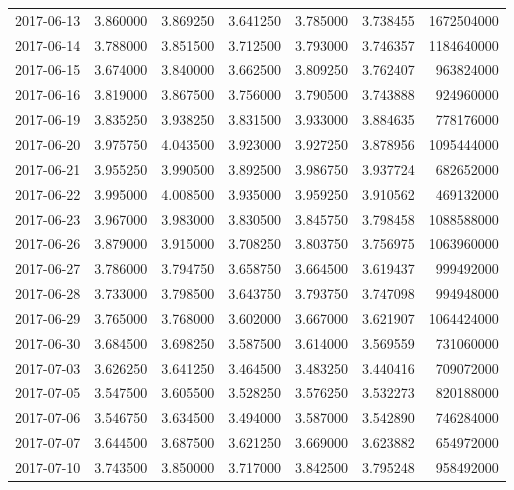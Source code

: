 \begin{tabular}{lrrrrrr}
2017-06-13 &    3.860000 &    3.869250 &    3.641250 &    3.785000 &    3.738455 &  1672504000 \\
2017-06-14 &    3.788000 &    3.851500 &    3.712500 &    3.793000 &    3.746357 &  1184640000 \\
2017-06-15 &    3.674000 &    3.840000 &    3.662500 &    3.809250 &    3.762407 &   963824000 \\
2017-06-16 &    3.819000 &    3.867500 &    3.756000 &    3.790500 &    3.743888 &   924960000 \\
2017-06-19 &    3.835250 &    3.938250 &    3.831500 &    3.933000 &    3.884635 &   778176000 \\
2017-06-20 &    3.975750 &    4.043500 &    3.923000 &    3.927250 &    3.878956 &  1095444000 \\
2017-06-21 &    3.955250 &    3.990500 &    3.892500 &    3.986750 &    3.937724 &   682652000 \\
2017-06-22 &    3.995000 &    4.008500 &    3.935000 &    3.959250 &    3.910562 &   469132000 \\
2017-06-23 &    3.967000 &    3.983000 &    3.830500 &    3.845750 &    3.798458 &  1088588000 \\
2017-06-26 &    3.879000 &    3.915000 &    3.708250 &    3.803750 &    3.756975 &  1063960000 \\
2017-06-27 &    3.786000 &    3.794750 &    3.658750 &    3.664500 &    3.619437 &   999492000 \\
2017-06-28 &    3.733000 &    3.798500 &    3.643750 &    3.793750 &    3.747098 &   994948000 \\
2017-06-29 &    3.765000 &    3.768000 &    3.602000 &    3.667000 &    3.621907 &  1064424000 \\
2017-06-30 &    3.684500 &    3.698250 &    3.587500 &    3.614000 &    3.569559 &   731060000 \\
2017-07-03 &    3.626250 &    3.641250 &    3.464500 &    3.483250 &    3.440416 &   709072000 \\
2017-07-05 &    3.547500 &    3.605500 &    3.528250 &    3.576250 &    3.532273 &   820188000 \\
2017-07-06 &    3.546750 &    3.634500 &    3.494000 &    3.587000 &    3.542890 &   746284000 \\
2017-07-07 &    3.644500 &    3.687500 &    3.621250 &    3.669000 &    3.623882 &   654972000 \\
2017-07-10 &    3.743500 &    3.850000 &    3.717000 &    3.842500 &    3.795248 &   958492000 \\

\end{tabular}
